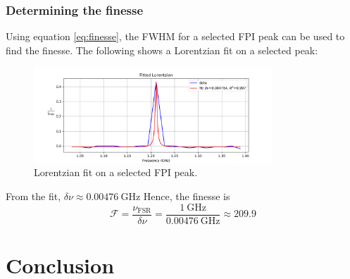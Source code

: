 \documentclass{article}
\begin{document}
\pagebreak{}

\subsubsection{Determining the finesse}

Using equation \ref{eq:finesse}, the FWHM for a selected FPI peak can be used to find the finesse. The following shows a Lorentzian fit on a selected peak:

\begin{figure}[h]
	\centering
	\includegraphics[width=0.8\textwidth]{Figures/FPI_Fit.png}
	\caption{Lorentzian fit on a selected FPI peak.}
	\label{fig:lorentzian_fit}
\end{figure}

From the fit, $\delta \nu \approx 0.00476 \ \text{GHz}$ Hence, the finesse is \[ \mathscr{F} = \frac{\nu_{\text{FSR}}}{\delta \nu} = \frac{1 \ \text{GHz}}{0.00476 \ \text{GHz}} \approx 209.9\]



\section{Conclusion}

\pagebreak{}

\begin{appendices}


\end{appendices}

\pagebreak{}

 
 
\end{document}
